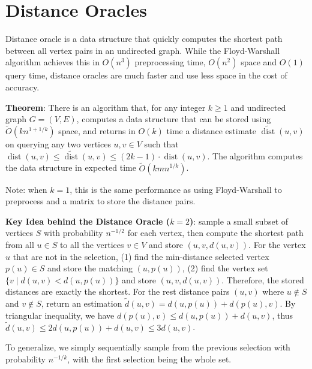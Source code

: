 \section{Distance Oracles}

Distance oracle is a data structure that quickly computes the shortest path between all vertex pairs in an undirected graph. While the Floyd-Warshall algorithm achieves this in $O(n^3)$ preprocessing time, $O(n^2)$ space and $O(1)$ query time, distance oracles are much faster and use less space in the cost of accuracy.

\textbf{Theorem}: There is an algorithm that, for any integer $k \geq 1$ and undirected graph $G=(V, E)$, computes a data structure that can be stored using $\tilde{O}\left(k n^{1+1 / k}\right)$ space, and  returns in $O(k)$ time a distance estimate $\widetilde{\operatorname{dist}}(u, v)$ on querying any two vertices $u, v \in V$ such that
$
\operatorname{dist}(u, v) \leq \widetilde{\operatorname{dist}}(u, v) \leq(2 k-1) \cdot \operatorname{dist}(u, v).
$
The algorithm computes the data structure in expected time $\tilde{O}\left(k m n^{1 / k}\right)$.

Note: when $k=1$, this is the same performance as using Floyd-Warshall to preprocess and a matrix to store the distance pairs.

\textbf{Key Idea behind the Distance Oracle ($k=2$)}: sample a small subset of vertices $S$ with probability $n^{-1/2}$ for each vertex, then compute the shortest path from all $u \in S$ to all the vertices $v \in V$ and store $(u, v, d(u,v))$. For the vertex $u$ that are not in the selection, (1) find the min-distance selected vertex $p(u) \in S$ and store the matching $(u, p(u))$, (2) find the vertex set $\{v\mid d(u,v) < d(u, p(u))\}$ and store $(u, v, d(u, v))$. Therefore, the stored distances are exactly the shortest. For the rest distance pairs $(u, v)$ where $u \notin S$ and $v \notin S$, return an estimation $\tilde{d}(u,v) = d(u, p(u)) + d(p(u), v)$. By triangular inequality, we have $d(p(u), v) \le d(u, p(u)) + d(u, v)$, thus $\tilde{d}(u,v) \le 2d(u, p(u)) + d(u, v) \le 3d(u,v)$.

To generalize, we simply sequentially sample from the previous selection with probability $n^{-1/k}$, with the first selection being the whole set.